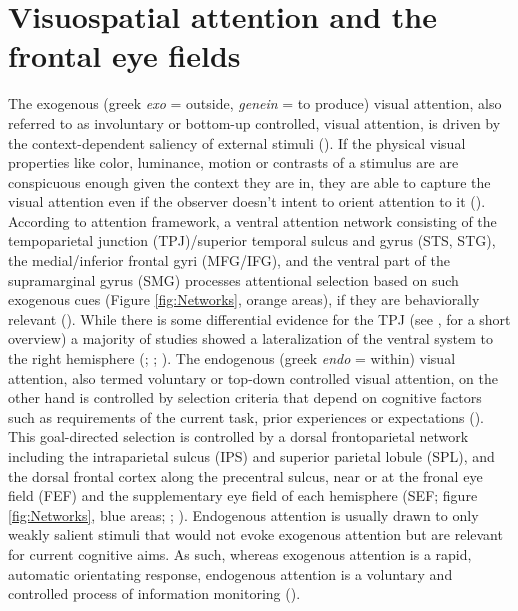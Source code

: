 \documentclass[a4paper, 12pt]{scrreprt}
\begin{document}
\section{Visuospatial attention and the frontal eye fields}\label{section:visualattention}
The exogenous (greek \textit{exo} = outside, \textit{genein} = to produce) visual attention, also referred to as involuntary or bottom-up controlled, visual attention, is driven by the context-dependent saliency of external stimuli (\cite{itti2001computational}). If the physical visual properties like color, luminance, motion or contrasts of a stimulus are are conspicuous enough given the context they are in, they are able to capture the visual attention even if the observer doesn’t intent to orient attention to it (\cite{chica2013two}). According to \textcite{corbetta2002control} attention framework, a ventral attention network consisting of the tempoparietal junction (TPJ)/superior temporal sulcus and gyrus (STS, STG), the medial/inferior frontal gyri (MFG/IFG), and the ventral part of the supramarginal gyrus (SMG) processes attentional selection based on such exogenous cues (Figure \ref{fig:Networks}, orange areas), if they are behaviorally relevant (\cite{downar2000multimodal}). While there is some differential evidence for the TPJ (see \textcite{vossel2014dorsal}, for a short overview) a majority of studies showed a lateralization of the ventral system to the right hemisphere (\cite{corbetta2002control}; \cite{fox2006spontaneous}; \cite{corbetta2008reorienting}). \newline 
The endogenous (greek \textit{endo} = within) visual attention, also termed voluntary or top-down controlled visual attention, on the other hand is controlled by selection criteria that depend on cognitive factors such as requirements of the current task, prior experiences or expectations (\cite{itti2001computational}). This goal-directed selection is controlled by a dorsal frontoparietal network including the intraparietal sulcus (IPS) and superior parietal lobule (SPL), and the dorsal frontal cortex along the precentral sulcus, near or at the fronal eye field (FEF) and the supplementary eye field of each hemisphere (SEF; figure \ref{fig:Networks}, blue areas; \cite{corbetta2002control}; \cite{corbetta2008reorienting}). Endogenous attention is usually drawn to only weakly salient stimuli that would not evoke exogenous attention but are relevant for current cognitive aims. As such, whereas exogenous attention is a rapid, automatic orientating response, endogenous attention is a voluntary and controlled process of information monitoring (\cite{carrasco2011visual}).
\end{document}
